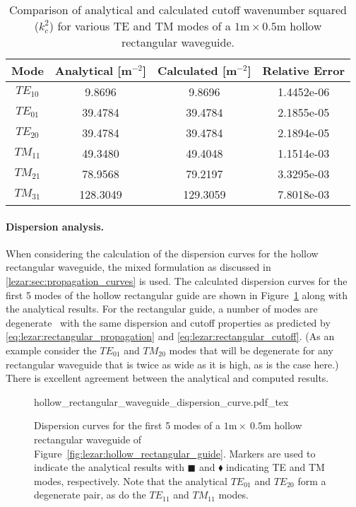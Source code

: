 \begin{table}
 \centering
    \caption{Comparison of analytical and calculated cutoff
    wavenumber squared ($k_c^2$) for various TE and TM modes of a
    $1\text{m}\times0.5\text{m}$ hollow rectangular waveguide.}
    \label{tab:lezar:rectangular_cutoff_comparison}
    \begin{tabular}{cccc}
      \toprule
      Mode & Analytical [m$^{-2}$] & Calculated [m$^{-2}$] & Relative Error \\
      \midrule
      $TE_{10}$ & 9.8696 & 9.8696 & 1.4452e-06\\
      $TE_{01}$ & 39.4784 & 39.4784 & 2.1855e-05\\
      $TE_{20}$ & 39.4784 & 39.4784 & 2.1894e-05\\
      \midrule
      $TM_{11}$ & 49.3480 & 49.4048 & 1.1514e-03 \\
      $TM_{21}$ & 78.9568 & 79.2197 & 3.3295e-03\\
      $TM_{31}$ & 128.3049 & 129.3059 & 7.8018e-03\\
      \bottomrule
    \end{tabular}
\end{table}

\paragraph{Dispersion analysis.}

When considering the calculation of the dispersion curves for the
hollow rectangular waveguide, the mixed formulation as discussed in
\ref{lezar:sec:propagation_curves} is used. The calculated dispersion
curves for the first 5 modes of the hollow rectangular guide are shown
in Figure~\ref{fig:lezar:hollow_rectangular_dispersion_curves}
along with the analytical results. For the rectangular
guide, a number of modes are degenerate~\cite[see][Chapter
10]{Davidson2011} with the same dispersion and cutoff properties
as predicted by \eqref{eq:lezar:rectangular_propagation} and
\eqref{eq:lezar:rectangular_cutoff}. (As an example consider the $TE_{01}$
and $TM_{20}$ modes that will be degenerate for any rectangular waveguide
that is twice as wide as it is high, as is the case here.) There is
excellent agreement between the analytical and computed results.
\begin{figure}
\bwfig
  \centering
    \def\svgwidth{\largefig}
  {hollow_rectangular_waveguide_dispersion_curve.pdf_tex}
  \caption{Dispersion curves for the first 5 modes of a
  $1\text{m}\times~0.5\text{m}$ hollow rectangular waveguide of
  Figure~\ref{fig:lezar:hollow_rectangular_guide}. Markers are used to
  indicate the analytical results with $\blacksquare$ and $\blacklozenge$
  indicating TE and TM modes, respectively. Note that the analytical
  $TE_{01}$ and $TE_{20}$ form a degenerate pair, as do the $TE_{11}$
  and $TM_{11}$ modes.}
  \label{fig:lezar:hollow_rectangular_dispersion_curves}
\end{figure}

